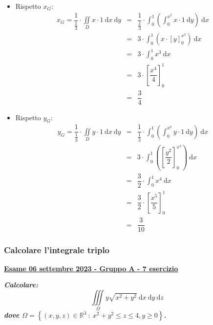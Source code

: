 \documentclass[a4paper]{article}
\newcommand{\definition}[1]{\textcolor{Red3}{\textbf{#1}}}
\newcommand{\example}[1]{\textcolor{Green4}{\textbf{#1}}}
\begin{document}
	\begin{itemize}
		\item Rispetto $x_{G}$:
		\begin{equation*}
			\begin{array}{rcl}
				x_{G} = \dfrac{1}{\frac{1}{3}} \cdot \displaystyle\iint\limits_{D} x \cdot 1 \:\mathrm{d}x\:\mathrm{d}y
				&=&
				\dfrac{1}{\frac{1}{3}} \cdot\displaystyle\int_{0}^{1} \left(\int_{0}^{x^{2}} x \cdot 1 \:\mathrm{d}y\right) \:\mathrm{d}x \\ [1.5em]
				&=&
				3 \cdot \displaystyle\int_{0}^{1} \left(x \cdot \left[y\right]_{0}^{x^{2}}\right) \:\mathrm{d}x \\ [1.5em]
				&=&
				3 \cdot \displaystyle\int_{0}^{1} x^{3} \:\mathrm{d}x \\ [1.5em]
				&=&
				3 \cdot \left[\dfrac{x^{4}}{4}\right]_{0}^{1} \\ [1em]
				&=&
				\dfrac{3}{4}
			\end{array}
		\end{equation*}

		\item Rispetto $y_{G}$:
		\begin{equation*}
			\begin{array}{rcl}
				y_{G} = \dfrac{1}{\frac{1}{3}} \cdot \displaystyle\iint\limits_{D} y \cdot 1 \:\mathrm{d}x\:\mathrm{d}y
				&=&
				\dfrac{1}{\frac{1}{3}} \cdot\displaystyle\int_{0}^{1} \left(\int_{0}^{x^{2}} y \cdot 1 \:\mathrm{d}y\right) \:\mathrm{d}x \\ [1.5em]
				&=&
				3 \cdot \displaystyle\int_{0}^{1} \left(\left[\dfrac{y^{2}}{2}\right]_{0}^{x^{2}}\right) \:\mathrm{d}x \\ [1.5em]
				&=&
				\dfrac{3}{2} \cdot \displaystyle\int_{0}^{1} x^{4} \:\mathrm{d}x \\ [1.5em]
				&=&
				\dfrac{3}{2} \cdot \left[\dfrac{x^{5}}{5}\right]_{0}^{1} \\ [1em]
				&=&
				\dfrac{3}{10}
			\end{array}
		\end{equation*}
	\end{itemize}

	\newpage

	\subsubsection{Calcolare l'integrale triplo}
	\begin{flushleft}
		\label{exam: esame 06 settembre 2023 - Gruppo A - 7 esercizio}
		\hypertarget{
			exam: esame 06 settembre 2023 - Gruppo A - 7 esercizio
		}{
			\definition{\underline{Esame 06 settembre 2023 - Gruppo A - 7 esercizio}}
		}
	\end{flushleft}
	\example{\emph{Calcolare:}
	\begin{equation*}
		\displaystyle\iiint\limits_{\Omega} y\sqrt{x^{2}+y^{2}} \:\mathrm{d}x\:\mathrm{d}y\:\mathrm{d}z
	\end{equation*}
	\emph{dove $\Omega = \left\{\left(x,y,z\right) \in \mathbb{R}^{3} \: : \: x^{2}+y^{2} \le z \le 4, y \ge 0\right\}$.}}\newline
\end{document}
